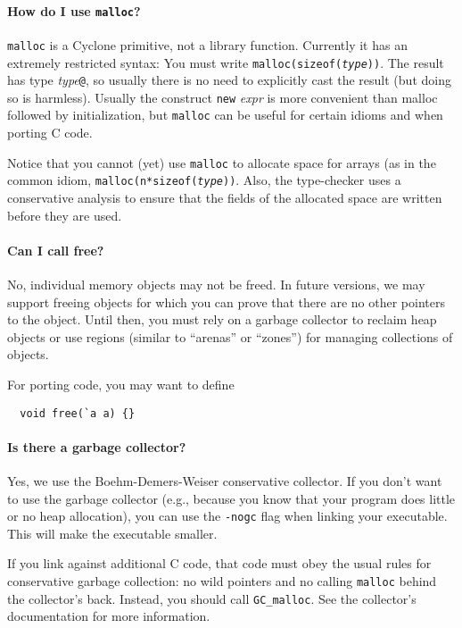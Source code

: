 \paragraph{How do I use \texttt{malloc}?}

\texttt{malloc} is a Cyclone primitive, not a library function.
Currently it has an extremely restricted syntax: You must write
\texttt{malloc(sizeof(\textit{type}))}.  The result has type
\textit{type}\texttt{@}, so usually there is no need to explicitly
cast the result (but doing so is harmless).  Usually the construct
\texttt{new} \textit{expr} is more convenient than malloc followed by
initialization, but \texttt{malloc} can be useful for certain idioms
and when porting C code.

Notice that you cannot (yet) use \texttt{malloc} to allocate space for
arrays (as in the common idiom, \texttt{malloc(n*sizeof({\it type}))}.
Also, the type-checker uses a conservative analysis to ensure that the
fields of the allocated space are written before they are used.

\paragraph{Can I call free?}

No, individual memory objects may not be freed.  In future versions,
we may support freeing objects for which you can prove that there are
no other pointers to the object.  Until then, you must rely on a
garbage collector to reclaim heap objects or use regions (similar to
``arenas'' or ``zones'') for managing collections of objects.

For porting code, you may want to define
\begin{verbatim}
  void free(`a a) {}
\end{verbatim}

\paragraph{Is there a garbage collector?}

Yes, we use the Boehm-Demers-Weiser conservative collector.  If you
don't want to use the garbage collector (e.g., because you know that
your program does little or no heap allocation), you can use the
\texttt{-nogc} flag when linking your executable.  This will make the
executable smaller.

If you link against additional C code, that code must obey the usual
rules for conservative garbage collection: no wild pointers and no
calling \texttt{malloc} behind the collector's back.  Instead, you
should call \texttt{GC_malloc}.  See the collector's documentation for
more information.


